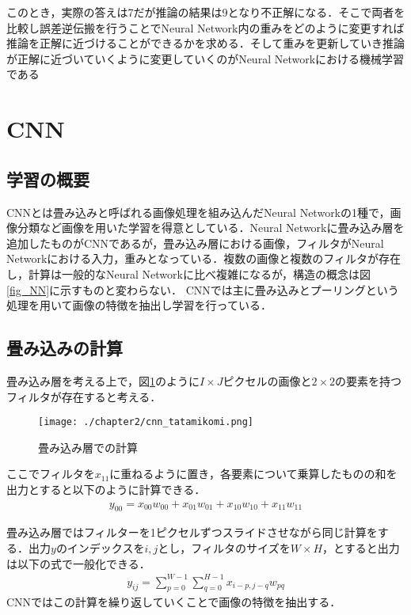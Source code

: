 このとき，実際の答えは7だが推論の結果は9となり不正解になる．そこで両者を比較し誤差逆伝搬を行うことでNeural Network内の重みをどのように変更すれば推論を正解に近づけることができるかを求める．そして重みを更新していき推論が正解に近づいていくように変更していくのがNeural Networkにおける機械学習である

\section{CNN}
\subsection{学習の概要}
CNNとは畳み込みと呼ばれる画像処理を組み込んだNeural Networkの1種で，画像分類など画像を用いた学習を得意としている．Neural Networkに畳み込み層を追加したものがCNNであるが，畳み込み層における画像，フィルタがNeural Networkにおける入力，重みとなっている．複数の画像と複数のフィルタが存在し，計算は一般的なNeural Networkに比べ複雑になるが，構造の概念は図\ref{fig_NN}に示すものと変わらない．
CNNでは主に畳み込みとプーリングという処理を用いて画像の特徴を抽出し学習を行っている．


\subsection{畳み込みの計算}
畳み込み層を考える上で，図\ref{fig_conv}のように$I \times J$ピクセルの画像と$2 \times 2$の要素を持つフィルタが存在すると考える．
\begin{figure}[]
  \begin{center}
    \texttt{[image: ./chapter2/cnn\_tatamikomi.png]}
    \caption{畳み込み層での計算}
    \label{fig_conv}
  \end{center}
\end{figure}
ここでフィルタを$x_{11}$に重ねるように置き，各要素について乗算したものの和を出力とすると以下のように計算できる．
\begin{align*}
  y_{00} = x_{00}w_{00} + x_{01}w_{01} + x_{10}w_{10} + x_{11}w_{11}
\end{align*}

畳み込み層ではフィルターを1ピクセルずつスライドさせながら同じ計算をする．出力$y$のインデックスを$i,j$とし，フィルタのサイズを$W\times H$，とすると出力は以下の式で一般化できる．
\begin{align*}
  y_{ij} = \sum^{W-1}_{p=0} \sum^{H-1}_{q=0} x_{i-p,j-q}w_{pq}
\end{align*}
CNNではこの計算を繰り返していくことで画像の特徴を抽出する．

